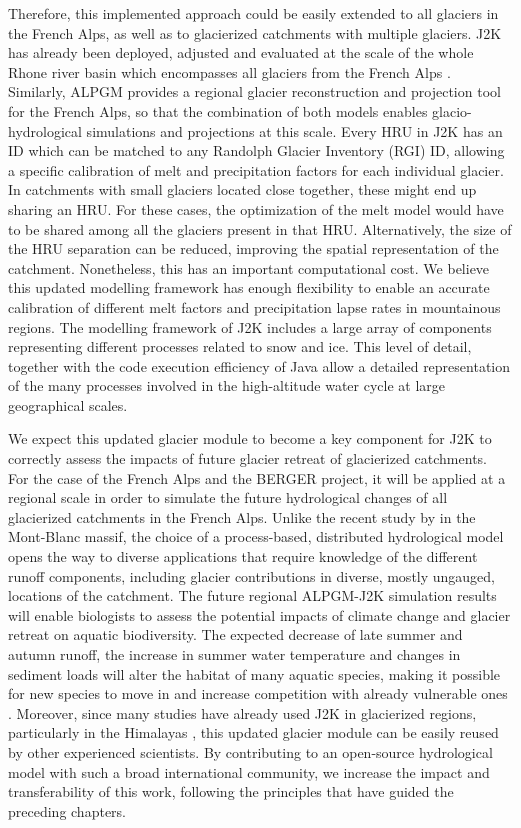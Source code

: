 Therefore, this implemented approach could be easily extended to all glaciers in the French Alps, as well as to glacierized catchments with multiple glaciers. J2K has already been deployed, adjusted and evaluated at the scale of the whole Rhone river basin which encompasses all glaciers from the French Alps \citep{braud_j2000-rhone_2017}. Similarly, ALPGM provides a regional glacier reconstruction and projection tool for the French Alps, so that the combination of both models enables glacio-hydrological simulations and projections at this scale. Every HRU in J2K has an ID which can be matched to any Randolph Glacier Inventory (RGI) ID, allowing a specific calibration of melt and precipitation factors for each individual glacier. In catchments with small glaciers located close together, these might end up sharing an HRU. For these cases, the optimization of the melt model would have to be shared among all the glaciers present in that HRU. Alternatively, the size of the HRU separation can be reduced, improving the spatial representation of the catchment. Nonetheless, this has an important computational cost. We believe this updated modelling framework has enough flexibility to enable an accurate calibration of different melt factors and precipitation lapse rates in mountainous regions. The modelling framework of J2K includes a large array of components representing different processes related to snow and ice. This level of detail, together with the code execution efficiency of Java allow a detailed representation of the many processes involved in the high-altitude water cycle at large geographical scales. 

We expect this updated glacier module to become a key component for J2K to correctly assess the impacts of future glacier retreat of glacierized catchments. For the case of the French Alps and the BERGER project, it will be applied at a regional scale in order to simulate the future hydrological changes of all glacierized catchments in the French Alps. Unlike the recent study by \citet{laurent_impact_2020} in the Mont-Blanc massif, the choice of a process-based, distributed hydrological model opens the way to diverse applications that require knowledge of the different runoff components, including glacier contributions in diverse, mostly ungauged, locations of the catchment. The future regional ALPGM-J2K simulation results will enable biologists to assess the potential impacts of climate change and glacier retreat on aquatic biodiversity. The expected decrease of late summer and autumn runoff, the increase in summer water temperature and changes in sediment loads will alter the habitat of many aquatic species, making it possible for new species to move in and increase competition with already vulnerable ones \citep{robinson_ecosystem_2014}. Moreover, since many studies have already used J2K in glacierized regions, particularly in the Himalayas \citep{gao_test_2012, nepal_understanding_2014, nepal_space-time_2020}, this updated glacier module can be easily reused by other experienced scientists. By contributing to an open-source hydrological model with such a broad international community, we increase the impact and transferability of this work, following the principles that have guided the preceding chapters. 

